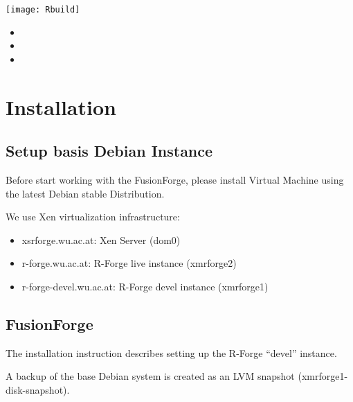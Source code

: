 \documentclass[a4paper]{article}
\begin{document}
\texttt{[image: Rbuild]}

\begin{itemize}
\item
\item
\item
\end{itemize}

\section{Installation}
\label{sec:installation}

\subsection{Setup basis Debian Instance}

Before start working with the FusionForge, please install Virtual
Machine using the latest Debian stable Distribution. 

\vspace{0.5cm}
We use Xen virtualization infrastructure:

\begin{itemize}
	\item xsrforge.wu.ac.at: Xen Server (dom0)
	\item r-forge.wu.ac.at: R-Forge live instance (xmrforge2)
	\item r-forge-devel.wu.ac.at: R-Forge devel instance (xmrforge1)
\end{itemize}

\subsection{FusionForge}

The installation instruction describes setting up the R-Forge
``devel'' instance. 

A backup of the base Debian system is created as an 
LVM snapshot (xmrforge1-disk-snapshot).
\end{document}
